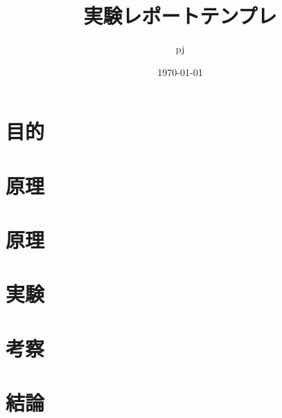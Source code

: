 \documentclass[11pt,a4paper,dvipdfmx]{jsarticle}
\title{実験レポートテンプレ}
\author{pj}
\date{\today}
\begin{document}
\maketitle
   \section{目的}
   \section{原理}
   \section{原理}
   \section{実験}
   \section{考察}
   \section{結論} 
\end{document}

